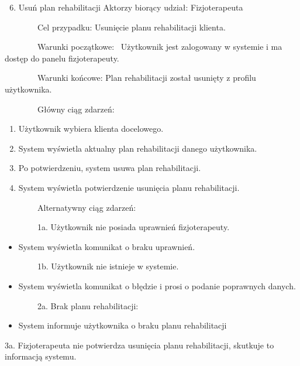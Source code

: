 {}

{}

{}

{}

\begin{enumerate}
\setcounter{enumi}{5}
\tightlist
\item
  {Usuń plan rehabilitacji}{\hfill\break
  Aktorzy biorący udział: Fizjoterapeuta}
\end{enumerate}

{~~~~~~~~Cel przypadku: Usunięcie planu rehabilitacji klienta.}

{~~~~~~~~Warunki początkowe: ~Użytkownik jest zalogowany w systemie i ma
dostęp do panelu fizjoterapeuty.}

{~~~~~~~~Warunki końcowe: Plan rehabilitacji został usunięty z profilu
użytkownika.}

{~~~~~~~~Główny ciąg zdarzeń:}

\begin{enumerate}
\tightlist
\item
  {Użytkownik wybiera klienta docelowego.}
\item
  {System wyświetla aktualny plan rehabilitacji danego użytkownika.}
\item
  {Po potwierdzeniu, system usuwa plan rehabilitacji.}
\item
  {System wyświetla potwierdzenie usunięcia planu rehabilitacji.}
\end{enumerate}

{~~~~~~~~Alternatywny ciąg zdarzeń:}

{~~~~~~~~1a. Użytkownik nie posiada uprawnień fizjoterapeuty.}

\begin{itemize}
\tightlist
\item
  {System wyświetla komunikat o braku uprawnień.}
\end{itemize}

{~~~~~~~~1b. Użytkownik nie istnieje w systemie.}

\begin{itemize}
\tightlist
\item
  {System wyświetla komunikat o błędzie i prosi o podanie poprawnych
  danych.}
\end{itemize}

{~~~~~~~~2a. Brak planu rehabilitacji:}

\begin{itemize}
\tightlist
\item
  {System informuje użytkownika o braku planu rehabilitacji}
\end{itemize}

{3a. Fizjoterapeuta nie potwierdza usunięcia planu
rehabilitacji, skutkuje to informacją systemu.}